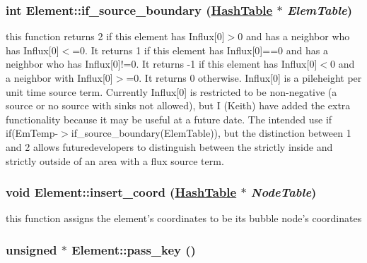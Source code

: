 \hypertarget{classElement_a112}{
\subsubsection[if\_\-source\_\-boundary]{\setlength{\rightskip}{0pt plus 5cm}int Element::if\_\-source\_\-boundary (\hyperlink{classHashTable}{Hash\-Table} $\ast$ {\em Elem\-Table})}}
\label{classElement_a112}


this function returns 2 if this element has Influx\mbox{[}0\mbox{]}$>$0 and has a neighbor who has Influx\mbox{[}0\mbox{]}$<$=0. It returns 1 if this element has Influx\mbox{[}0\mbox{]}==0 and has a neighbor who has Influx\mbox{[}0\mbox{]}!=0. It returns -1 if this element has Influx\mbox{[}0\mbox{]}$<$0 and a neighbor with Influx\mbox{[}0\mbox{]}$>$=0. It returns 0 otherwise. Influx\mbox{[}0\mbox{]} is a pileheight per unit time source term. Currently Influx\mbox{[}0\mbox{]} is restricted to be non-negative (a source or no source with sinks not allowed), but I (Keith) have added the extra functionality because it may be useful at a future date. The intended use if if(Em\-Temp-$>$if\_\-source\_\-boundary(Elem\-Table)), but the distinction between 1 and 2 allows futuredevelopers to distinguish between the strictly inside and strictly outside of an area with a flux source term. 

\hypertarget{classElement_a74}{
\subsubsection[insert\_\-coord]{\setlength{\rightskip}{0pt plus 5cm}void Element::insert\_\-coord (\hyperlink{classHashTable}{Hash\-Table} $\ast$ {\em Node\-Table})}}
\label{classElement_a74}


this function assigns the element's coordinates to be its bubble node's coordinates 

\hypertarget{classElement_a7}{
\subsubsection[pass\_\-key]{\setlength{\rightskip}{0pt plus 5cm}unsigned $\ast$ Element::pass\_\-key ()}}
\label{classElement_a7}


